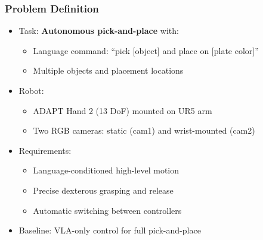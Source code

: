\documentclass{beamer}
\begin{document}
\begin{frame}
  \frametitle{Problem Definition}
  \small
  \begin{itemize}
    \item Task: \textbf{Autonomous pick-and-place} with:
      \begin{itemize}
        \item Language command: ``pick [object] and place on [plate color]''
        \item Multiple objects and placement locations
      \end{itemize}
    \item Robot:
      \begin{itemize}
        \item ADAPT Hand 2 (13 DoF) mounted on UR5 arm
        \item Two RGB cameras: static (cam1) and wrist-mounted (cam2)
      \end{itemize}
    \item Requirements:
      \begin{itemize}
        \item Language-conditioned high-level motion
        \item Precise dexterous grasping and release
        \item Automatic switching between controllers
      \end{itemize}
    \item Baseline: VLA-only control for full pick-and-place
  \end{itemize}
\end{frame}
\end{document}
